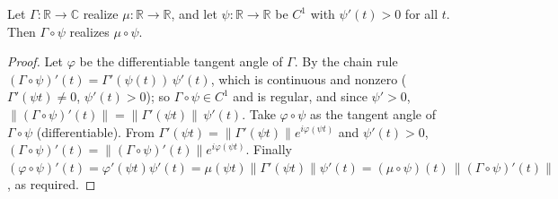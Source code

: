 \begin{lemma}
  \label{lem:realizes_curvature_comp}
  Let $\Gamma:\mathbb{R}\to\mathbb{C}$ realize $\mu:\mathbb{R}\to\mathbb{R}$, and let
  $\psi:\mathbb{R}\to\mathbb{R}$ be $C^1$ with $\psi'(t)>0$ for all $t$. Then
  $\Gamma\circ\psi$ realizes $\mu\circ\psi$.
\end{lemma}
\begin{proof}
  \leanok
  Let $\varphi$ be the differentiable tangent angle of $\Gamma$. By the chain rule
  $(\Gamma\circ\psi)'(t)=\Gamma'(\psi(t))\,\psi'(t)$, which is continuous and
  nonzero ($\Gamma'(\psi t)\ne0$, $\psi'(t)>0$); so $\Gamma\circ\psi\in C^1$ and is
  regular, and since $\psi'>0$,
  $\lVert(\Gamma\circ\psi)'(t)\rVert=\lVert\Gamma'(\psi t)\rVert\,\psi'(t)$. Take
  $\varphi\circ\psi$ as the tangent angle of $\Gamma\circ\psi$ (differentiable).
  From $\Gamma'(\psi t)=\lVert\Gamma'(\psi t)\rVert e^{i\varphi(\psi t)}$ and
  $\psi'(t)>0$,
  $(\Gamma\circ\psi)'(t)=\lVert(\Gamma\circ\psi)'(t)\rVert e^{i\varphi(\psi t)}$.
  Finally $(\varphi\circ\psi)'(t)=\varphi'(\psi t)\psi'(t)=
  \mu(\psi t)\lVert\Gamma'(\psi t)\rVert\psi'(t)=
  (\mu\circ\psi)(t)\,\lVert(\Gamma\circ\psi)'(t)\rVert$, as required.
\end{proof}

